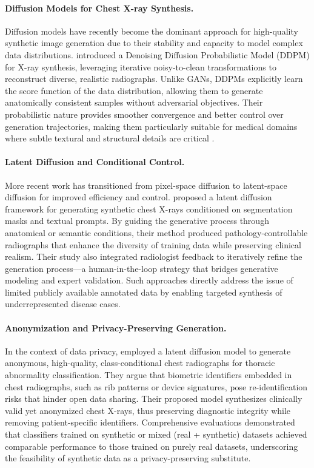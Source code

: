 \paragraph{Diffusion Models for Chest X-ray Synthesis.}
Diffusion models have recently become the dominant approach for high-quality synthetic image generation due to their stability and capacity to model complex data distributions. 
\citet{mahaulpatha2024ddpm} introduced a Denoising Diffusion Probabilistic Model (DDPM) for X-ray synthesis, leveraging iterative noisy-to-clean transformations to reconstruct diverse, realistic radiographs. 
Unlike GANs, DDPMs explicitly learn the score function of the data distribution, allowing them to generate anatomically consistent samples without adversarial objectives. 
Their probabilistic nature provides smoother convergence and better control over generation trajectories, making them particularly suitable for medical domains where subtle textural and structural details are critical \citep{novel_unified_conditional_score_based_generative_framework_2022}.

\paragraph{Latent Diffusion and Conditional Control.}
More recent work has transitioned from pixel-space diffusion to latent-space diffusion for improved efficiency and control. 
\citet{prakash2025evaluating} proposed a latent diffusion framework for generating synthetic chest X-rays conditioned on segmentation masks and textual prompts. 
By guiding the generative process through anatomical or semantic conditions, their method produced pathology-controllable radiographs that enhance the diversity of training data while preserving clinical realism. 
Their study also integrated radiologist feedback to iteratively refine the generation process—a human-in-the-loop strategy that bridges generative modeling and expert validation. 
Such approaches directly address the issue of limited publicly available annotated data by enabling targeted synthesis of underrepresented disease cases. 

\paragraph{Anonymization and Privacy-Preserving Generation.}
In the context of data privacy, \citet{generation_anonymous_chest_radiographs_2023} employed a latent diffusion model to generate anonymous, high-quality, class-conditional chest radiographs for thoracic abnormality classification. 
They argue that biometric identifiers embedded in chest radiographs, such as rib patterns or device signatures, pose re-identification risks that hinder open data sharing. 
Their proposed model synthesizes clinically valid yet anonymized chest X-rays, thus preserving diagnostic integrity while removing patient-specific identifiers. 
Comprehensive evaluations demonstrated that classifiers trained on synthetic or mixed (real + synthetic) datasets achieved comparable performance to those trained on purely real datasets, underscoring the feasibility of synthetic data as a privacy-preserving substitute.

